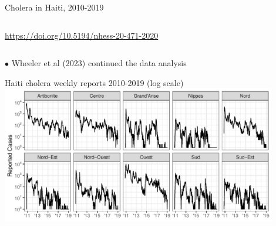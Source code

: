 \documentclass{beamer}
\begin{document}
\begin{frame}{Cholera in Haiti, 2010-2019}
\begin{columns}[T]
\begin{column}{.62\textwidth}
  \vspace{-3mm}
  
  \begin{center}
    {  \tiny \url{https://doi.org/10.5194/nhess-20-471-2020}}
  \end{center}
  

\end{column}

\end{columns}

  \vspace{4mm}
  
   $\bullet$ Wheeler et al (2023) continued the data analysis

\end{frame}

\begin{frame}{Haiti cholera weekly reports 2010-2019 (log scale)}
\includegraphics[width=12cm]{haiti/Plot_Reported_Cases-1.pdf}
\end{frame}
\end{document}
